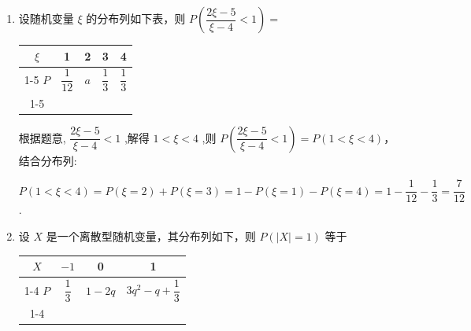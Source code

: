 \begin{enumerate}
\begin{enumerate}
\begin{jieda}
\begin{enumerate}
\begin{center}
                \end{center}
                
                \item 因为 $\dfrac{1}{3} + \dfrac{1}{3} + \dfrac{1}{4} = \dfrac{11}{12},\dfrac{1}{3} + \dfrac{1}{3} + \dfrac{1}{4} + \dfrac{1}{12} = 1$ ，
                
                又因为 $P\left( {Y < x}\right)  = \dfrac{11}{12}$ ,所以 $4 < x \leq  9$ .
                
                $\therefore$ 实数 $x$ 的取值范围是 $(4,9\rbrack$ .
            \end{enumerate}
        \end{jieda}
        
        \item 设随机变量 $\xi$ 的分布列如下表，则 $P\left( {\dfrac{{2\xi } - 5}{\xi  - 4} < 1}\right)  =$ 
        
        \begin{center}
        
        \begin{tabular}{|c|c|c|c|c|}
        \hline
        $\xi$ & 1 & 2 & 3 & 4 \\
        \cline{1-5}
        $P$ & $\dfrac{1}{12}$ & $a$ & $\dfrac{1}{3}$ & $\dfrac{1}{3}$ \\
        \cline{1-5}
        \hline
        \end{tabular}
        
        \end{center}
        \begin{jieda}
            根据题意, $\dfrac{{2\xi } - 5}{\xi  - 4} < 1$ ,解得 $1 < \xi  < 4$ ,则 $P\left( {\dfrac{{2\xi } - 5}{\xi  - 4} < 1}\right)  = P\left( {1 < \xi  < 4}\right)$，结合分布列:
            
            $P\left( {1 < \xi  < 4}\right)  = P\left( {\xi  = 2}\right)  + P\left( {\xi  = 3}\right)  = 1 - P\left( {\xi  = 1}\right)  - P\left( {\xi  = 4}\right)  = 1 - \dfrac{1}{12} - \dfrac{1}{3} = \dfrac{7}{12}$ .
        \end{jieda}
    
        \item 设 $X$ 是一个离散型随机变量，其分布列如下，则 $P\left( |X| = 1\right)$ 等于

        \begin{center}
        
        \begin{tabular}{|c|c|c|c|}
        \hline
        $X$ & $-1$ & 0 & 1 \\
        \cline{1-4}
        $P$ & $\dfrac{1}{3}$ & $1-2q$ & $3{q}^{2} - q  + \dfrac{1}{3}$ \\
        \cline{1-4}
        \hline
        \end{tabular}
        

\end{center}
\end{enumerate}
\end{enumerate}
